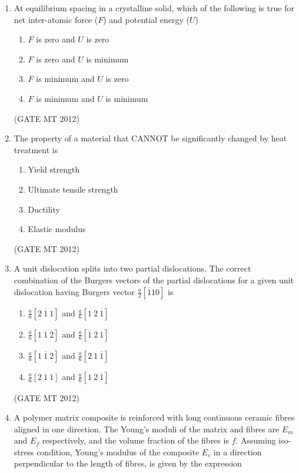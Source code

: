 \documentclass[journal, 11pt, onecolumn]{IEEEtran}
\theoremstyle{remark}
\begin{document}
\begin{enumerate}
\begin{enumerate}
\item At equilibrium spacing in a crystalline solid, which of the following is true for net inter-atomic force ($F$) and potential energy ($U$)  
\begin{multicols}{2}
\begin{enumerate}  
\item $F$ is zero and $U$ is zero
\item $F$ is zero and $U$ is minimum
\item $F$ is minimum and $U$ is zero
\item $F$ is minimum and $U$ is minimum
\end{enumerate}
\end{multicols}
\hfill(GATE MT 2012)
 

\item The property of a material that CANNOT be significantly changed by heat treatment is  
\begin{multicols}{2}
\begin{enumerate}  
\item Yield strength
\item Ultimate tensile strength
\item Ductility
\item Elastic modulus
\end{enumerate}
\end{multicols}
\hfill(GATE MT 2012)

\item A unit dislocation splits into two partial dislocations. The correct combination of the Burgers vectors of the partial dislocations for a given unit dislocation having Burgers vector \( \frac{a}{2}[\overline{1}10] \) is

\begin{multicols}{2}
\begin{enumerate}  
\item \( \frac{a}{6} [2\ \overline{1}\ 1] \) and \( \frac{a}{6} [1\ 2\ \overline{1}] \)
\item \( \frac{a}{6} [1\ \overline{1}\ 2] \) and \( \frac{a}{6} [\overline{1}\ 2\ 1] \)
\item \( \frac{a}{6} [1\ \overline{1}\ 2] \) and \( \frac{a}{6} [2\ 1\ \overline{1}] \)
\item \( \frac{a}{6} [2\ 1\ 1] \) and \( \frac{a}{6} [1\ 2\ \overline{1}] \)
\end{enumerate}
\end{multicols}
\hfill(GATE MT 2012)


\item A polymer matrix composite is reinforced with long continuous ceramic fibres aligned in one direction. The Young’s moduli of the matrix and fibres are \(E_m\) and \(E_f\) respectively, and the volume fraction of the fibres is \(f\). Assuming iso-stress condition, Young’s modulus of the composite \(E_c\) in a direction perpendicular to the length of fibres, is given by the expression


\end{enumerate}
\end{enumerate}
\end{document}
